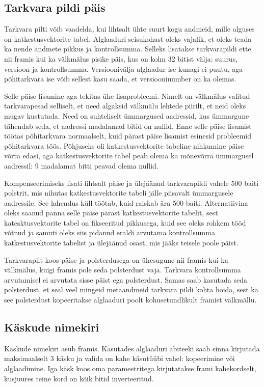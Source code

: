 \documentclass[12pt,a4paper]{article}
\begin{document}
\subsection{Tarkvara pildi päis}
\label{sec:impl:header}
Tarkvara pilti võib vaadelda, kui lihtsalt ühte suurt kogu andmeid, mille
alguses on katkestusvektorite tabel. Alglaaduri seisukohast oleks vajalik, et
oleks teada ka nende andmete pikkus ja kontrollsumma. Selleks lisatakse
tarkvarapildi ette nii \gls{fram}is kui ka välkmälus pisike päis, kus on kolm 32
bitist välja: suurus, versioon ja kontrollsumma. Versioonivälja alglaadur ise
kunagi ei puutu, aga põhitarkvara ise võib sellest kasu saada, et
versiooninumber on ka olemas.

Selle päise lisamine aga tekitas ühe lisaprobleemi. Nimelt on välkmälus valitud
tarkvarapesad selliselt, et need algaksid välkmälu lehtede piirilt, et neid
oleks mugav kustutada. Need on suhteliselt ümmargused aadressid, kus ümmargune
tähendab seda, et aadressi madalamad bitid on nullid. Enne selle päise lisamist
töötas põhitarkvara normaalselt, kuid pärast päise lisamist esinesid probleemid
põhitarkvara töös. Põhjuseks oli katkestusvektorite tabeline nihkumine päise
võrra edasi, aga katkestusvektorite tabel peab olema ka mõnevõrra ümmargusel
aadressil: 9 madalamat bitti peavad olema nullid\cite{cm3pm}.

Kompenseerimiseks lisati lihtsalt päise ja ülejäänud tarkvarapildi vahele 500
baiti polstrit, mis nihutas katkestusvektorite tabeli jälle piisavalt
ümmargusele aadressile. See lahendus küll töötab, kuid raiskab ära 500 baiti.
Alternatiivina oleks saanud panna selle päise pärast katkestusvektorite tabelit,
sest katesktusvektorite tabel on fikseeritud pikkusega, kuid see oleks rohkem
tööd võtnud ja samuti oleks siis pidanud eraldi arvutama kontrollsumma
katkestusvektorite tabelist ja ülejäänud osast, mis jääks teisele poole päist.

Tarkvarapilt koos päise ja polsterdusega on ühesugune nii \gls{fram}is kui ka
välkmälus, kuigi \gls{fram}is pole seda polsterdust vaja. Tarkvara kontrollsumma
arvutamisel ei arvutata sisse päist ega polsterdust. Samas saab kasutada seda
polsterdust, et seal veel mingeid metaandmeid tarkvara pildi kohta hoida, sest ka
see polsterdust kopeeritakse alglaaduri poolt kohusetundlikult \gls{fram}ist
välkmällu.

\subsection{Käskude nimekiri}
Käskude nimekiri asub \gls{fram}is. Kasutades alglaaduri abiteeki saab sinna kirjutada
maksimaalselt 3 käsku ja valida on kahe käsutüübi vahel: kopeerimine või
alglaadimine. Iga käsk koos oma parameetritega kirjutatakse \gls{fram}i kahekordselt,
kusjuures teine kord on kõik bitid inverteeritud. 
\end{document}
